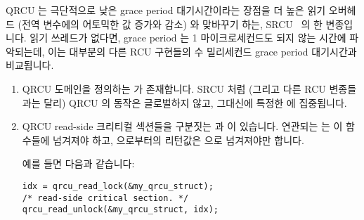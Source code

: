 QRCU 는 극단적으로 낮은 grace period 대기시간이라는 장점을 더 높은 읽기
오버헤드 (전역 변수에의 어토믹한 값 증가와 감소) 와 맞바꾸기 하는,
SRCU~\cite{PaulEMcKenney2006c} 의 한 변종입니다.
읽기 쓰레드가 없다면, grace period 는 1 마이크로세컨드도 되지 않는 시간에
파악되는데, 이는 대부분의 다른 RCU 구현들의 수 밀리세컨드 grace period
대기시간과 비교됩니다.
\iffalse

QRCU is a variant of SRCU~\cite{PaulEMcKenney2006c}
that trades somewhat higher read overhead
(atomic increment and decrement on a global variable) for extremely
low grace-period latencies.
If there are no readers, the grace period will be detected in less
than a microsecond, compared to the multi-millisecond grace-period
latencies of most other RCU implementations.
\fi

\begin{enumerate}
\item	QRCU 도메인을 정의하는  가 존재합니다.
	SRCU 처럼 (그리고 다른 RCU 변종들과는 달리) QRCU 의 동작은 글로벌하지
	않고, 그대신에 특정한  에 집중됩니다.
\item	QRCU read-side 크리티컬 섹션들을 구분짓는  과
	 이 있습니다.
	연관되는  는 이 함수들에 넘겨져야 하고,
	 으로부터의 리턴값은  으로
	넘겨져야만 합니다.

	예를 들면 다음과 같습니다:
\iffalse

\item	There is a \co{qrcu_struct} that defines a QRCU domain.
	Like SRCU (and unlike other variants of RCU) QRCU's action
	is not global, but instead focused on the specified
	\co{qrcu_struct}.
\item	There are \co{qrcu_read_lock()} and \co{qrcu_read_unlock()}
	primitives that delimit QRCU read-side critical sections.
	The corresponding \co{qrcu_struct} must be passed into
	these primitives, and the return value from \co{qrcu_read_lock()}
	must be passed to \co{qrcu_read_unlock()}.

	For example:
\fi

\vspace{5pt}
\begin{minipage}[t]{\columnwidth}
\scriptsize
\begin{verbatim}
idx = qrcu_read_lock(&my_qrcu_struct);
/* read-side critical section. */
qrcu_read_unlock(&my_qrcu_struct, idx);
\end{verbatim}
\end{minipage}
\vspace{5pt}


\end{enumerate}
